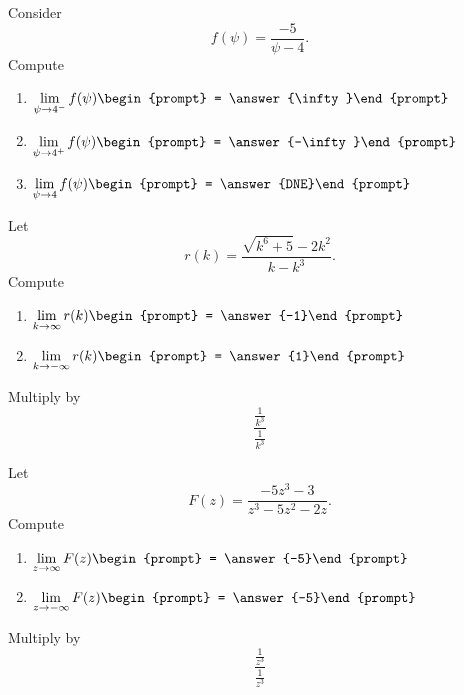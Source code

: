 \documentclass[handout]{ximera}
\begin{document}
\begin{exercise}
Consider 
\[
f(\psi) = \frac{-5}{\psi -4}.
\]
Compute
\begin{enumerate}
\item $\displaystyle\lim_{\psi\to 4^- } f(\psi) \begin{prompt} = \answer{\infty}\end{prompt}$
\item $\displaystyle\lim_{\psi\to 4^+ } f(\psi) \begin{prompt} = \answer{-\infty}\end{prompt}$
\item $\displaystyle\lim_{\psi\to 4 } f(\psi) \begin{prompt} = \answer{DNE}\end{prompt}$
\end{enumerate}
\end{exercise}


\begin{exercise}
Let 
\[
r(k) = \frac{\sqrt{k^6+5}-2 k^2}{k-k^3}.
\]
Compute
\begin{enumerate}
\item $\displaystyle\lim_{k\to \infty} r(k) \begin{prompt} = \answer{-1}\end{prompt}$
\item $\displaystyle\lim_{k\to -\infty}r(k) \begin{prompt} = \answer{1}\end{prompt}$
\end{enumerate}
\begin{hint}
Multiply by
\[
\frac{\frac{1}{k^3}}{\frac{1}{k^3}}
\]
\end{hint}
\end{exercise}


\begin{exercise}
Let 
\[
F(z) = \frac{-5 z^3-3}{z^3-5 z^2-2 z}.
\]
Compute
\begin{enumerate}
\item $\displaystyle\lim_{z\to \infty} F(z) \begin{prompt} = \answer{-5}\end{prompt}$
\item $\displaystyle\lim_{z\to -\infty}F(z) \begin{prompt} = \answer{-5}\end{prompt}$
\end{enumerate}
\begin{hint}
Multiply by
\[
\frac{\frac{1}{z^3}}{\frac{1}{z^3}}
\]
\end{hint}
\end{exercise}
\end{document}
